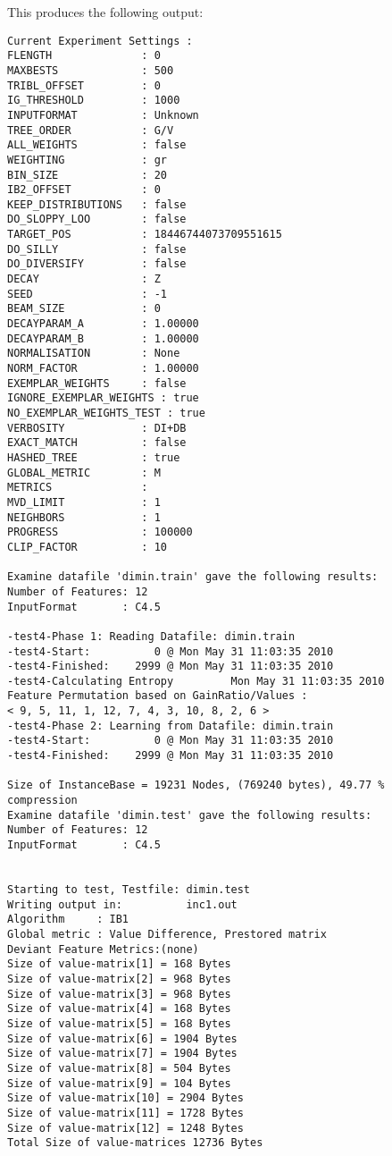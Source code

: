 \documentclass{report}
\begin{document}
This produces the following output:

\begin{footnotesize}
\begin{verbatim}
Current Experiment Settings :
FLENGTH              : 0
MAXBESTS             : 500
TRIBL_OFFSET         : 0
IG_THRESHOLD         : 1000
INPUTFORMAT          : Unknown
TREE_ORDER           : G/V
ALL_WEIGHTS          : false
WEIGHTING            : gr
BIN_SIZE             : 20
IB2_OFFSET           : 0
KEEP_DISTRIBUTIONS   : false
DO_SLOPPY_LOO        : false
TARGET_POS           : 18446744073709551615
DO_SILLY             : false
DO_DIVERSIFY         : false
DECAY                : Z
SEED                 : -1
BEAM_SIZE            : 0
DECAYPARAM_A         : 1.00000
DECAYPARAM_B         : 1.00000
NORMALISATION        : None
NORM_FACTOR          : 1.00000
EXEMPLAR_WEIGHTS     : false
IGNORE_EXEMPLAR_WEIGHTS : true
NO_EXEMPLAR_WEIGHTS_TEST : true
VERBOSITY            : DI+DB
EXACT_MATCH          : false
HASHED_TREE          : true
GLOBAL_METRIC        : M
METRICS              : 
MVD_LIMIT            : 1
NEIGHBORS            : 1
PROGRESS             : 100000
CLIP_FACTOR          : 10

Examine datafile 'dimin.train' gave the following results:
Number of Features: 12
InputFormat       : C4.5

-test4-Phase 1: Reading Datafile: dimin.train
-test4-Start:          0 @ Mon May 31 11:03:35 2010
-test4-Finished:    2999 @ Mon May 31 11:03:35 2010
-test4-Calculating Entropy         Mon May 31 11:03:35 2010
Feature Permutation based on GainRatio/Values :
< 9, 5, 11, 1, 12, 7, 4, 3, 10, 8, 2, 6 >
-test4-Phase 2: Learning from Datafile: dimin.train
-test4-Start:          0 @ Mon May 31 11:03:35 2010
-test4-Finished:    2999 @ Mon May 31 11:03:35 2010

Size of InstanceBase = 19231 Nodes, (769240 bytes), 49.77 % compression
Examine datafile 'dimin.test' gave the following results:
Number of Features: 12
InputFormat       : C4.5


Starting to test, Testfile: dimin.test
Writing output in:          inc1.out
Algorithm     : IB1
Global metric : Value Difference, Prestored matrix
Deviant Feature Metrics:(none)
Size of value-matrix[1] = 168 Bytes 
Size of value-matrix[2] = 968 Bytes 
Size of value-matrix[3] = 968 Bytes 
Size of value-matrix[4] = 168 Bytes 
Size of value-matrix[5] = 168 Bytes 
Size of value-matrix[6] = 1904 Bytes 
Size of value-matrix[7] = 1904 Bytes 
Size of value-matrix[8] = 504 Bytes 
Size of value-matrix[9] = 104 Bytes 
Size of value-matrix[10] = 2904 Bytes 
Size of value-matrix[11] = 1728 Bytes 
Size of value-matrix[12] = 1248 Bytes 
Total Size of value-matrices 12736 Bytes 


\end{verbatim}
\end{footnotesize}
\end{document}
